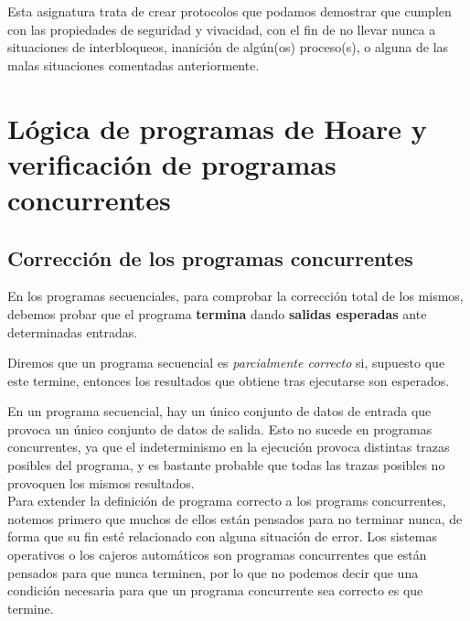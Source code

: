 Esta asignatura trata de crear protocolos que podamos demostrar que cumplen con las propiedades de seguridad y vivacidad, con el fin de no llevar nunca a situaciones de interbloqueos, inanición de algún(os) proceso(s), o alguna de las malas situaciones comentadas anteriormente.

\section{Lógica de programas de Hoare y verificación de programas concurrentes}
\subsection{Corrección de los programas concurrentes}
En los programas secuenciales, para comprobar la corrección total de los mismos, debemos probar que el programa \textbf{termina} dando \textbf{salidas esperadas} ante determinadas entradas.

Diremos que un programa secuencial es \textit{parcialmente correcto} si, supuesto que este termine, entonces los resultados que obtiene tras ejecutarse son esperados.

En un programa secuencial, hay un único conjunto de datos de entrada que provoca un único conjunto de datos de salida. Esto no sucede en programas concurrentes, ya que el indeterminismo en la ejecución provoca distintas trazas posibles del programa, y es bastante probable que todas las trazas posibles no provoquen los mismos resultados.\\

Para extender la definición de programa correcto a los programs concurrentes, notemos primero que muchos de ellos están pensados para no terminar nunca, de forma que su fin esté relacionado con alguna situación de error. Los sistemas operativos o los cajeros automáticos son programas concurrentes que están pensados para que nunca terminen, por lo que no podemos decir que una condición necesaria para que un programa concurrente sea correcto es que termine.\\

